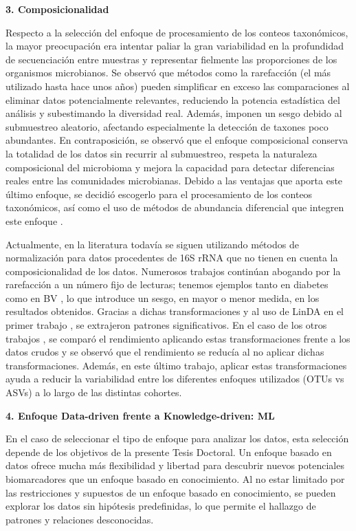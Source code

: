 \textbf{3. Composicionalidad}

Respecto a la selección del enfoque de procesamiento de los conteos taxonómicos, la mayor preocupación era intentar paliar la gran variabilidad en la profundidad de secuenciación entre muestras y representar fielmente las proporciones de los organismos microbianos. Se observó que métodos como la rarefacción (el más utilizado hasta hace unos años) pueden simplificar en exceso las comparaciones al eliminar datos potencialmente relevantes, reduciendo la potencia estadística del análisis y subestimando la diversidad real. Además, imponen un sesgo debido al submuestreo aleatorio, afectando especialmente la detección de taxones poco abundantes. En contraposición, se observó que el enfoque composicional conserva la totalidad de los datos sin recurrir al submuestreo, respeta la naturaleza composicional del microbioma y mejora la capacidad para detectar diferencias reales entre las comunidades microbianas. Debido a las ventajas que aporta este último enfoque, se decidió escogerlo para el procesamiento de los conteos taxonómicos, así como el uso de métodos de abundancia diferencial que integren este enfoque \cite{hong2022rarefy, gloor2016compositional, gloor2017microbiome, zhou2022linda}.

Actualmente, en la literatura todavía se siguen utilizando métodos de normalización para datos procedentes de 16S rRNA que no tienen en cuenta la composicionalidad de los datos. Numerosos trabajos continúan abogando por la rarefacción a un número fijo de lecturas; tenemos ejemplos tanto en diabetes \cite{lambeth2015composition, dash2023functional, siptroth2023variation} como en BV \cite{chen2018vaginal, onywera2021predictive}, lo que introduce un sesgo, en mayor o menor medida, en los resultados obtenidos. Gracias a dichas transformaciones y al uso de LinDA en el primer trabajo \cite{paper1}, se extrajeron patrones significativos. En el caso de los otros trabajos \cite{paper2, paper3}, se comparó el rendimiento aplicando estas transformaciones frente a los datos crudos y se observó que el rendimiento se reducía al no aplicar dichas transformaciones. Además, en este último trabajo, aplicar estas transformaciones ayuda a reducir la variabilidad entre los diferentes enfoques utilizados (OTUs vs ASVs) a lo largo de las distintas cohortes.

\textbf{4. Enfoque Data-driven frente a Knowledge-driven: ML}

En el caso de seleccionar el tipo de enfoque para analizar los datos, esta selección depende de los objetivos de la presente Tesis Doctoral. Un enfoque basado en datos ofrece mucha más flexibilidad y libertad para descubrir nuevos potenciales biomarcadores que un enfoque basado en conocimiento. Al no estar limitado por las restricciones y supuestos de un enfoque basado en conocimiento, se pueden explorar los datos sin hipótesis predefinidas, lo que permite el hallazgo de patrones y relaciones desconocidas.

